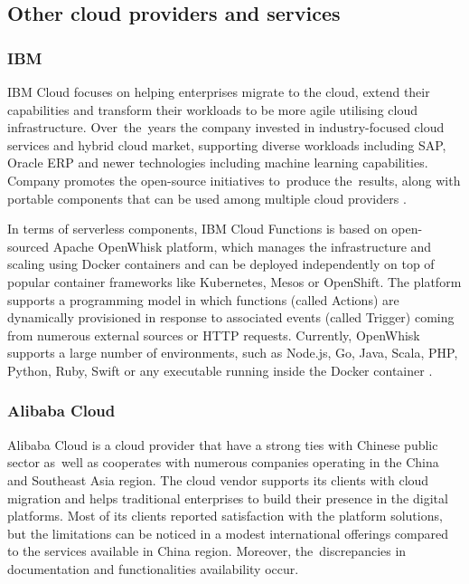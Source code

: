 \subsection{Other cloud providers and services}

\subsubsection{IBM}
IBM Cloud focuses on helping enterprises migrate to the cloud, extend their capabilities and transform their workloads to be more agile utilising cloud infrastructure. Over~the~years the company invested in industry-focused cloud services and hybrid cloud market, supporting diverse workloads including SAP, Oracle ERP and newer technologies including machine learning capabilities. Company promotes the open-source initiatives to~produce the~results, along with portable components that can be used among multiple cloud providers \cite{Gartner}.

In terms of serverless components, IBM Cloud Functions is based on open-sourced Apache OpenWhisk platform, which manages the infrastructure and scaling using Docker containers and can be deployed independently on top of popular container frameworks like Kubernetes, Mesos or OpenShift. The platform supports a programming model in which functions (called Actions) are dynamically provisioned in response to associated events (called Trigger) coming from numerous external sources or HTTP requests. Currently, OpenWhisk supports a large number of environments, such as Node.js, Go, Java, Scala, PHP, Python, Ruby, Swift or any executable running inside the Docker container \cite{ApacheOpenWhisk}.

\subsubsection{Alibaba Cloud}

Alibaba Cloud is a cloud provider that have a strong ties with Chinese public sector as~well as cooperates with numerous companies operating in the China and Southeast Asia region. The cloud vendor supports its clients with cloud migration and helps traditional enterprises to build their presence in the digital platforms. Most of its clients reported satisfaction with the platform solutions, but the limitations can be noticed in a modest international offerings compared to the services available in China region. Moreover, the~discrepancies in documentation and functionalities availability \cite{Gartner} occur.

